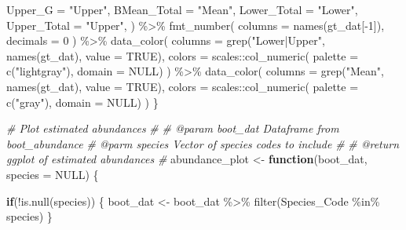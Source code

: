 \documentclass[
]{article}
\newenvironment{Shaded}{\begin{snugshade}}{\end{snugshade}}
\newcommand{\AttributeTok}[1]{\textcolor[rgb]{0.77,0.63,0.00}{#1}}
\newcommand{\CommentTok}[1]{\textcolor[rgb]{0.56,0.35,0.01}{\textit{#1}}}
\newcommand{\ConstantTok}[1]{\textcolor[rgb]{0.00,0.00,0.00}{#1}}
\newcommand{\ControlFlowTok}[1]{\textcolor[rgb]{0.13,0.29,0.53}{\textbf{#1}}}
\newcommand{\DecValTok}[1]{\textcolor[rgb]{0.00,0.00,0.81}{#1}}
\newcommand{\FunctionTok}[1]{\textcolor[rgb]{0.00,0.00,0.00}{#1}}
\newcommand{\NormalTok}[1]{#1}
\newcommand{\OtherTok}[1]{\textcolor[rgb]{0.56,0.35,0.01}{#1}}
\newcommand{\SpecialCharTok}[1]{\textcolor[rgb]{0.00,0.00,0.00}{#1}}
\newcommand{\StringTok}[1]{\textcolor[rgb]{0.31,0.60,0.02}{#1}}
\begin{document}
\begin{Shaded}
\begin{Highlighting}[]
      \AttributeTok{Upper\_G =} \StringTok{"Upper"}\NormalTok{,}
      \AttributeTok{BMean\_Total =} \StringTok{"Mean"}\NormalTok{,}
      \AttributeTok{Lower\_Total =} \StringTok{"Lower"}\NormalTok{,}
      \AttributeTok{Upper\_Total =} \StringTok{"Upper"}\NormalTok{,}
\NormalTok{    ) }\SpecialCharTok{\%\textgreater{}\%}
    \FunctionTok{fmt\_number}\NormalTok{(}
      \AttributeTok{columns =} \FunctionTok{names}\NormalTok{(gt\_dat[}\SpecialCharTok{{-}}\DecValTok{1}\NormalTok{]),}
      \AttributeTok{decimals =} \DecValTok{0}
\NormalTok{    ) }\SpecialCharTok{\%\textgreater{}\%}
    \FunctionTok{data\_color}\NormalTok{(}
      \AttributeTok{columns =} \FunctionTok{grep}\NormalTok{(}\StringTok{"Lower|Upper"}\NormalTok{, }\FunctionTok{names}\NormalTok{(gt\_dat), }\AttributeTok{value =} \ConstantTok{TRUE}\NormalTok{),}
      \AttributeTok{colors =}\NormalTok{ scales}\SpecialCharTok{::}\FunctionTok{col\_numeric}\NormalTok{(}
        \AttributeTok{palette =} \FunctionTok{c}\NormalTok{(}\StringTok{"lightgray"}\NormalTok{),}
        \AttributeTok{domain =} \ConstantTok{NULL}\NormalTok{)}
\NormalTok{    ) }\SpecialCharTok{\%\textgreater{}\%}
    \FunctionTok{data\_color}\NormalTok{(}
      \AttributeTok{columns =} \FunctionTok{grep}\NormalTok{(}\StringTok{"Mean"}\NormalTok{, }\FunctionTok{names}\NormalTok{(gt\_dat), }\AttributeTok{value =} \ConstantTok{TRUE}\NormalTok{),}
      \AttributeTok{colors =}\NormalTok{ scales}\SpecialCharTok{::}\FunctionTok{col\_numeric}\NormalTok{(}
        \AttributeTok{palette =} \FunctionTok{c}\NormalTok{(}\StringTok{"gray"}\NormalTok{),}
        \AttributeTok{domain =} \ConstantTok{NULL}\NormalTok{)}
\NormalTok{    )}
\NormalTok{\}}

\CommentTok{\# Plot estimated abundances}
\CommentTok{\# }
\CommentTok{\# @param boot\_dat Dataframe from boot\_abundance}
\CommentTok{\# @parm species Vector of species codes to include}
\CommentTok{\#}
\CommentTok{\# @return ggplot of estimated abundances}
\CommentTok{\#}
\NormalTok{abundance\_plot }\OtherTok{\textless{}{-}} \ControlFlowTok{function}\NormalTok{(boot\_dat, }\AttributeTok{species =} \ConstantTok{NULL}\NormalTok{) \{}
  
  \ControlFlowTok{if}\NormalTok{(}\SpecialCharTok{!}\FunctionTok{is.null}\NormalTok{(species)) \{}
\NormalTok{    boot\_dat }\OtherTok{\textless{}{-}}\NormalTok{ boot\_dat }\SpecialCharTok{\%\textgreater{}\%}
                  \FunctionTok{filter}\NormalTok{(Species\_Code }\SpecialCharTok{\%in\%}\NormalTok{ species)}
\NormalTok{  \}}
  

\end{Highlighting}
\end{Shaded}
\end{document}
